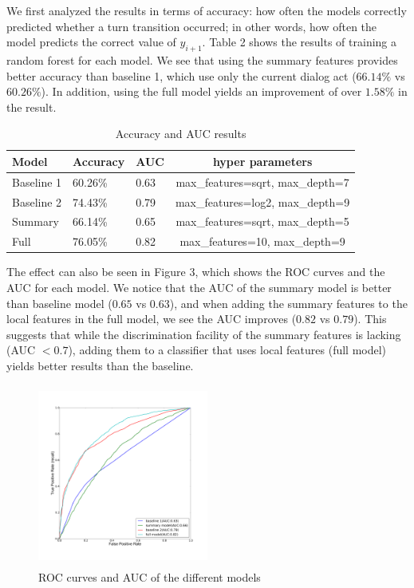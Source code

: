 We first analyzed the results in terms of accuracy: how often the models correctly predicted whether a turn transition occurred; in other words, how often the model predicts the correct value of $y_{i+1}$.
%
Table 2 shows the results of training a random forest for each model.
We see that using the summary features provides better accuracy than baseline 1, which use only the current dialog act ($66.14\%$ vs $60.26\%$). In addition, using the full model yields an improvement of over $1.58\%$ in the result.
%
\begin{table}[ht!]
\scriptsize
   \begin{center}
    \begin{tabular}{| l | l | l | c |}
    \hline
    Model & Accuracy & AUC & hyper parameters\\
    \hline
    Baseline 1      & 60.26\% & 0.63 & \scriptsize{max\_features=sqrt, max\_depth=7} \\
    Baseline 2     & 74.43\% & 0.79 & \scriptsize{max\_features=log2, max\_depth=9}\\
    Summary        & 66.14\% & 0.65 & \scriptsize{max\_features=sqrt, max\_depth=5} \\
    Full           & 76.05\% & 0.82 &\scriptsize{max\_features=10, max\_depth=9}\\
  \hline
\end{tabular}
\end{center}
\vspace{-1.2em}
\caption{Accuracy and AUC results }
\end{table}

The effect can also be seen in Figure 3, which shows the ROC curves and the AUC for each
model. We notice that the AUC of the summary model is better than baseline model ($0.65$ vs $0.63$), and when adding the summary features to the local features in the full model, we see the AUC improves ($0.82$ vs $0.79$). This suggests that while the discrimination facility of the summary features is lacking (AUC $<0.7$), adding them to a classifier that uses local features (full model) yields better results than the baseline.
%
 \begin{figure}[ht!]
 \centering
 \includegraphics[width=0.5\textwidth,width=6cm,height=6cm,keepaspectratio]{roc.pdf}\vspace{-1.5em}
 \caption{ROC curves and AUC of the different models \label{overflow}}
 \end{figure}

